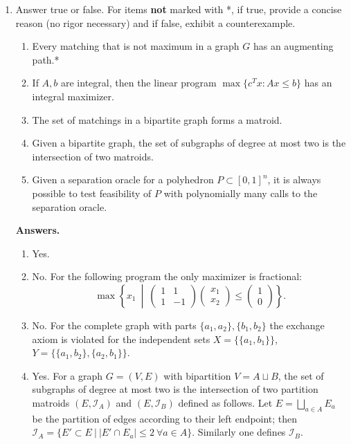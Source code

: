 \documentclass[12pt]{article}
\begin{document}
\begin{enumerate}

\item
Answer true or false. For items \textbf{not} marked with *, if true, provide a concise reason (no rigor necessary) and if false, exhibit a counterexample.
\begin{enumerate}
\item Every matching that is not maximum in a graph $G$ has an augmenting path.*
\item If $A, b$ are integral, then the linear program $\max\{c^T x: Ax \leq b\}$ has an integral maximizer.
\item The set of matchings in a bipartite graph forms a matroid.
\item Given a bipartite graph, the set of subgraphs of degree at most two is the intersection of two matroids.
\item Given a separation oracle for a polyhedron $P\subset [0,1]^n$, it is always possible to test feasibility of $P$ with polynomially many calls to the separation oracle.
\end{enumerate}

\textbf{Answers.}

\begin{enumerate}
\item Yes.
\item No. For the following program the only maximizer is fractional:
\[
\max \left\{ x_1 ~\middle\vert~
\begin{pmatrix}
  1 & 1 \\
  1 & -1
\end{pmatrix}
\begin{pmatrix}
  x_1 \\
  x_2 
\end{pmatrix}\le
\begin{pmatrix}
  1 \\
  0
\end{pmatrix}
\right\}.
\]  

\item No. For the complete graph with parts $\{a_1, a_2\}, \{b_1, b_2\}$ the exchange axiom is violated for the independent sets $X = \{\{a_1, b_1\}\}$, $Y = \{\{a_1, b_2\}, \{a_2, b_1\}\}$.
    
\item Yes. For a graph $G = (V,E)$ with bipartition $V = A \sqcup B$, the set of subgraphs of degree at most two is the intersection of two partition matroids $(E, \mathcal{I}_A)$ and $(E, \mathcal{I}_B)$ defined as follows. Let $E = \bigsqcup_{a\in A} E_a$ be the partition of edges according to their left endpoint; then $\mathcal{I}_A = \{E' \subset E ~\vert~ |E' \cap E_a| \le 2 ~\forall a \in A\}$. Similarly one defines $\mathcal{I}_B$.


\end{enumerate}
\end{enumerate}
\end{document}
